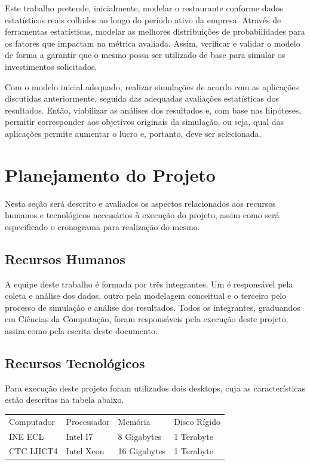 \documentclass[pt,disc,oneside]{ufscpgeasthesis}
\begin{document}
			Este trabalho pretende, inicialmente, modelar o restaurante conforme dados estatísticos reais colhidos ao longo do período ativo da empresa.
			Através de ferramentas estatísticas, modelar as melhores distribuições de probabilidades para os fatores que impactam na métrica avaliada.
			Assim, verificar e validar o modelo de forma a garantir que o mesmo possa ser utilizado de base para simular os investimentos solicitados.

			Com o modelo inicial adequado, realizar simulações de acordo com as aplicações discutidas anteriormente, seguida das adequadas avaliações estatísticas dos resultados.
			Então, viabilizar as análises dos resultados e, com base nas hipóteses, permitir corresponder aos objetivos originais da simulação, ou seja, qual das aplicações permite aumentar o lucro e, portanto, deve ser selecionada.

		\section{Planejamento do Projeto}
		\label{sec:planejamento}

			Nesta seção será descrito e avaliados os aspectos relacionados aos recursos humanos e tecnológicos necessários à execução do projeto, assim como será especificado o cronograma para realização do mesmo.

			\subsection{Recursos Humanos}
			\label{subsec:recursos-humanos}

                A equipe deste trabalho é formada por três integrantes.
                Um é responsável pela coleta e análise dos dados, outro pela modelagem conceitual e o terceiro pelo processo de simulação e análise dos resultados.
                Todos os integrantes, graduandos em Ciências da Computação, foram responsáveis pela execução deste projeto, assim como pela escrita deste documento.

            \subsection{Recursos Tecnológicos}
            \label{subsec:recursos-tecnologicos}

                Para execução deste projeto foram utilizados dois desktops, cuja as características estão descritas na tabela abaixo.

				\begin{table}[h]
					\centering
					\begin{tabular}{l|l|l|l}
						\rowcolor{gray!70} Computador 	& Processador 	& Memória 		& Disco Rígido	\\
                    	\rowcolor{gray!20} INE ECL		& Intel I7 		& 8 Gigabytes 	& 1 Terabyte 	\\
                    	\rowcolor{gray!40} CTC LIICT4 	& Intel Xeon 	& 16 Gigabytes 	& 1 Terabyte
					\end{tabular}
				\end{table}
\end{document}
